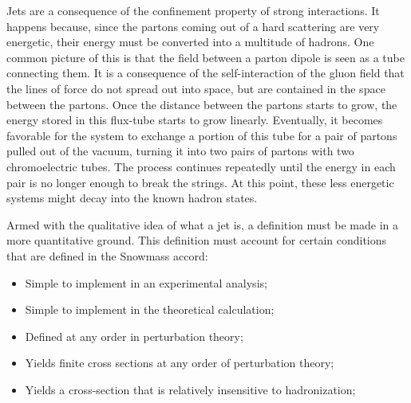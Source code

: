 Jets are a consequence of the confinement property of strong interactions\cite{halzen_quarks_1984,peskin_introduction_1995,salam_towards_2010}. It happens because, since the partons coming out of a hard scattering are very energetic, their energy must be converted into a multitude of hadrons. One common picture of this is that the field between a parton dipole is seen as a tube connecting them. It is a consequence of the self-interaction of the gluon field that the lines of force do not spread out into space, but are contained in the space between the partons. Once the distance between the partons starts to grow, the energy stored in this flux-tube starts to grow linearly. Eventually, it becomes favorable for the system to exchange a portion of this tube for a pair of partons pulled out of the vacuum, turning it into two pairs of partons with two chromoelectric tubes. The process continues repeatedly until the energy in each pair is no longer enough to break the strings. At this point, these less energetic systems might decay into the known hadron states.
\par
Armed with the qualitative idea of what a jet is, a definition must be made in a more quantitative ground. This definition must account for certain conditions that are defined in the Snowmass accord\cite{salam_towards_2010}:

\begin{itemize}

\item Simple to implement in an experimental analysis;
\item Simple to implement in the theoretical calculation;
\item Defined at any order in perturbation theory;
\item Yields finite cross sections at any order of perturbation theory;
\item Yields a cross-section that is relatively insensitive to hadronization;

\end{itemize}

